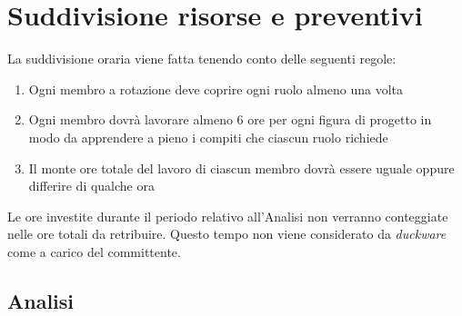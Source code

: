 \clearpage
\section{Suddivisione risorse e preventivi}
\label{sec:sud_risorse_preve}
La suddivisione oraria viene fatta tenendo conto delle seguenti regole:
\begin{enumerate}
\item Ogni membro a rotazione deve coprire ogni ruolo almeno una volta
\item Ogni membro dovrà lavorare almeno 6 ore per ogni figura di progetto in modo da apprendere a pieno i compiti che ciascun ruolo richiede
\item Il monte ore totale del lavoro di ciascun membro dovrà essere uguale oppure differire di qualche ora
\end{enumerate}
Le ore investite durante il periodo relativo all'Analisi non verranno conteggiate nelle ore totali da retribuire. Questo tempo non viene considerato da \textit{duckware} come a carico del committente.
\clearpage
\subsection{Analisi}
\label{sec:periodo_analisi}
